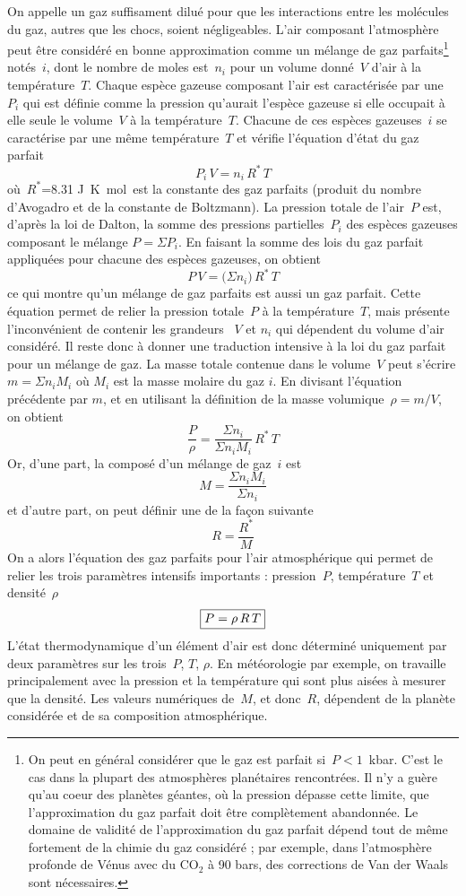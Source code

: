 \sk
On appelle  un gaz suffisament dilué pour que les interactions entre les molécules du gaz, autres que les chocs, soient négligeables. L'air composant l'atmosphère peut être considéré en bonne approximation comme un mélange de gaz parfaits\footnote{On peut en général considérer que le gaz est parfait si~$P < 1$~kbar. C'est le cas dans la plupart des atmosphères planétaires rencontrées. Il n'y a guère qu'au coeur des planètes géantes, où la pression dépasse cette limite, que l'approximation du gaz parfait doit être complètement abandonnée. Le domaine de validité de l'approximation du gaz parfait dépend tout de même fortement de la chimie du gaz considéré ; par exemple, dans l'atmosphère profonde de Vénus avec du CO$_2$ à 90 bars, des corrections de Van der Waals sont nécessaires.} notés~$i$, dont le nombre de moles est~$n_i$ pour un volume donné~$V$ d'air à la température~$T$. Chaque espèce gazeuse composant l'air est caractérisée par une ~$P_i$ qui est définie comme la pression qu'aurait l'espèce gazeuse si elle occupait à elle seule le volume~$V$ à la température~$T$. Chacune de ces espèces gazeuses~$i$ se caractérise par une même température~$T$ et vérifie l'équation d'état du gaz parfait $$ P_i \, V = n_i \, R^* \, T $$ où~$R^*$=8.31 J~K\mo~mol\mo~est la constante des gaz parfaits (produit du nombre d'Avogadro et de la constante de Boltzmann). La pression totale de l'air~$P$ est, d'après la loi de Dalton, la somme des pressions partielles~$P_i$ des espèces gazeuses composant le mélange $P=\Sigma P_i$. En faisant la somme des lois du gaz parfait appliquées pour chacune des espèces gazeuses, on obtient $$ P \, V = \big( \Sigma n_i \big) \, R^* \, T $$ ce qui montre qu'un mélange de gaz parfaits est aussi un gaz parfait. Cette équation permet de relier la pression totale~$P$ à la température~$T$, mais présente l'inconvénient de contenir les grandeurs ~$V$ et $n_i$ qui dépendent du volume d'air considéré. Il reste donc à donner une traduction intensive à la loi du gaz parfait pour un mélange de gaz. La masse totale contenue dans le volume~$V$ peut s'écrire $m=\Sigma n_iM_i$ où $M_i$ est la masse molaire du gaz $i$. En divisant l'équation précédente par $m$, et en utilisant la définition de la masse volumique~$\rho = m / V$, on obtient $$ \frac{P}{\rho} = \frac{\Sigma n_i}{\Sigma n_iM_i} \, R^* \, T $$ Or, d'une part, la  composé d'un mélange de gaz~$i$ est $$ \boxed{ M=\frac{\Sigma n_iM_i}{\Sigma n_i} }$$ et d'autre part, on peut définir une  de la façon suivante $$ R=\frac{R^*}{M} $$ On a alors l'équation des gaz parfaits pour l'air atmosphérique qui permet de relier les trois paramètres intensifs importants : pression~$P$, température~$T$ et densité~$\rho$ $$ \boxed{P = \rho \, R \,T} $$ L'état thermodynamique d'un élément d'air est donc déterminé uniquement par deux paramètres sur les trois~$P$, $T$, $\rho$. En météorologie par exemple, on travaille principalement avec la pression et la température qui sont plus aisées à mesurer que la densité. Les valeurs numériques de~$M$, et donc~$R$, dépendent de la planète considérée et de sa composition atmosphérique. 

